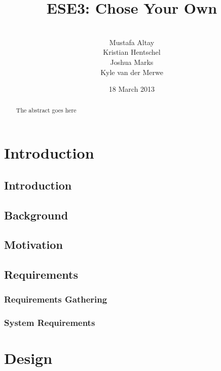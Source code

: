 \documentclass{l3proj}
\begin{document}
\title{ESE3: Chose Your Own}
\author{ \\
        Mustafa Altay\\
        Kristian Hentschel \\
        Joshua Marks \\
        Kyle van der Merwe}
\date{18 March 2013}
\maketitle
\begin{abstract}

The abstract goes here

\end{abstract}
\educationalconsent
\tableofcontents
\chapter{Introduction}
\label{intro}
\section{Introduction}

\section{Background}

\section{Motivation}

\section{Requirements}
\label{requirements}

\subsection{Requirements Gathering}
\label{gathering}

\subsection{System Requirements}
\label{system}

\chapter{Design}
\label{design}
\end{document}
